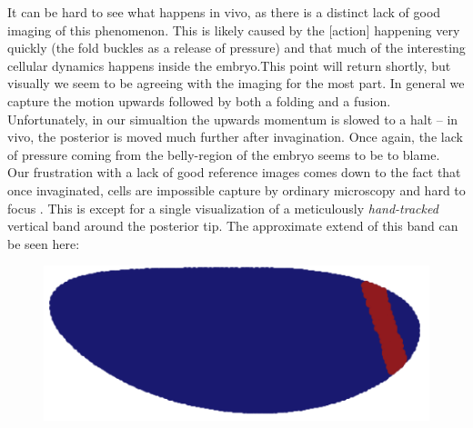 It can be hard to see what happens in vivo, as there is a distinct lack of good imaging of this phenomenon. This is likely caused by the [action] happening very quickly (the fold buckles as a release of pressure) and that much of the interesting cellular dynamics happens inside the embryo.\reph This point will return shortly, but visually we seem to be agreeing with the imaging for the most part. In general we capture the motion upwards followed by both a folding and a fusion. Unfortunately, in our simualtion the upwards momentum is slowed to a halt -- in vivo, the posterior is moved much further after invagination. Once again, the lack of pressure coming from the belly-region of the embryo seems to be to blame. \\

Our frustration with a lack of good reference images comes down to the fact that once invaginated, cells are impossible capture by ordinary microscopy and hard to focus . This is except for a single visualization of a meticulously \textit{hand-tracked} vertical band around the posterior tip. The approximate extend of this band can be seen here:

\begin{figure}[H]
    \centering
    \includegraphics[width=0.5\linewidth]{chapters//Results//figures/daniel_band_pos.png}
\end{figure}

